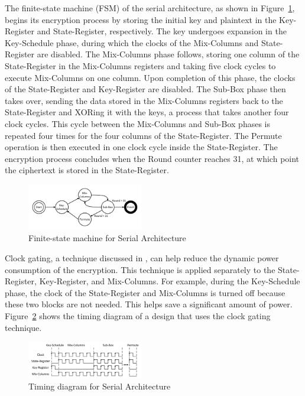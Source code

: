 \documentclass[final,5p,times,twocolumn]{elsarticle}
\begin{document}
The finite-state machine (FSM) of the serial architecture, as shown in Figure~\ref{serial_fsm_fig}, begins its encryption process by storing the initial key and plaintext in the Key-Register and State-Register, respectively.
The key undergoes expansion in the Key-Schedule phase, during which the clocks of the Mix-Columns and State-Register are disabled.
The Mix-Columns phase follows, storing one column of the State-Register in the Mix-Columns registers and taking five clock cycles to execute Mix-Columns on one column.
Upon completion of this phase, the clocks of the State-Register and Key-Register are disabled.
The Sub-Box phase then takes over, sending the data stored in the Mix-Columns registers back to the State-Register and XORing it with the keys, a process that takes another four clock cycles.
This cycle between the Mix-Columns and Sub-Box phases is repeated four times for the four columns of the State-Register.
The Permute operation is then executed in one clock cycle inside the State-Register.
The encryption process concludes when the Round counter reaches 31, at which point the ciphertext is stored in the State-Register.

\begin{figure}[h]%
    \centering
    \includegraphics[width=0.45\textwidth]{./fig/serial-fsm.pdf}
    \caption{Finite-state machine for Serial Architecture}\label{serial_fsm_fig}
\end{figure}

Clock gating, a technique discussed in \cite{shahbazi2020area}, can help reduce the dynamic power consumption of the encryption.
This technique is applied separately to the State-Register, Key-Register, and Mix-Columns.
For example, during the Key-Schedule phase, the clock of the State-Register and Mix-Columns is turned off because these two blocks are not needed.
This helps save a significant amount of power. Figure~\ref{serial_time_diagrm} shows the timing diagram of a design that uses the clock gating technique.

\begin{figure}[h]%
    \centering
    \includegraphics[width=0.45\textwidth]{./fig/serial-time.pdf}
    \caption{Timing diagram for Serial Architecture}\label{serial_time_diagrm}
\end{figure}
\end{document}
